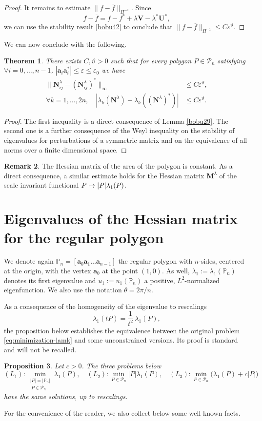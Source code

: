 \documentclass[11pt]{article}
\numberwithin{equation}{section}\newtheorem*{jepEnonce}{\jepEnonceTitle}\newenvironment{enonce*}[1]{\def\jepEnonceTitle{#1}\jepEnonce}{\endjepEnonce}\newtheorem*{conj*}{Conjecture}
\def\mto{\mathchoice{\longmapsto}{\mapsto}{\mapsto}{\mapsto}}
\theoremstyle{plain}
\newtheorem{thm}{Theorem}[section]
\newtheorem{propo}[thm]{Proposition}
\theoremstyle{definition}
\newtheorem{rem}[thm]{Remark}
\newcommand{\bo}[1]{{\boldsymbol#1}}
\newcommand{\thetathree}{\vartheta}
\def\Pp{{\mathbb{P}_n}}
\newcommand{\vps}{\varepsilon}
\newcommand{\lb}{\lambda}
\newcommand{\ov}{\overline}
\begin{document}
\begin{proof}
It remains to estimate $ \| f -\ov f\| _{H^{-1}}$. Since
\[
f-\ov f= f-f^* + \lb \bo V-\lb^* \bo U^*,
\]
we can use the stability result \eqref{bobu42} to conclude that
$\| f -\ov f\| _{H^{-1}} \le C \vps^\thetathree$.
\end{proof}

We can now conclude with the following.
\begin{thm}\label{bobu43}
There exists $C, \thetathree >0$ such that for every polygon $P \in {\mathcal P}_n$ satisfying $\forall i=0, \dots, n-1$, $|\bo a_i\bo a_i^*| \le \vps \le \vps _0$ we have
\begin{align*}
\|\bo N^\lb _{ij} -(\bo N^\lb _{ij})^*\|_\infty &\le C \vps^\thetathree,
\\
\forall k=1, \dots, 2n, \quad |\lb_k(\bo N^\lb)- \lb_k((\bo N^{\lb})^*)|&\le C \vps^\thetathree.
\end{align*}
\end{thm}
\begin{proof}
The first inequality is a direct consequence of Lemma \ref{bobu29}. The second one is a further consequence of the Weyl inequality on the stability of eigenvalues for perturbations of a symmetric matrix and on the equivalence of all norms over a finite dimensional space.
\end{proof}

\begin{rem}
The Hessian matrix of the area of the polygon is constant. As a direct consequence, a similar estimate holds for the Hessian matrix $\bo M^\lambda$ of the scale invariant functional $P\mto |P|\lambda_1(P)$.
\end{rem}

\section{Eigenvalues of the Hessian matrix for the regular polygon}
\label{sec:eig-hessian}

We denote again $\Pp =[\bo a_0 \bo a_1 \dots\bo a_{n-1}]$ the regular polygon with $n$-sides, centered at the origin, with the vertex $\bo a_0$ at the point $(1,0)$. As well, $\lb_1:= \lb_1(\Pp)$ denotes its first eigenvalue and $u_1:=u_1(\Pp)$ a positive, $L^2$-normalized eigenfunction. We also use the notation $\theta = 2\pi/n$.

As a consequence of the homogeneity of the eigenvalue to rescalings
\[
\lambda_1(tP) = \frac{1}{t^2}\, \lambda_1(P),
\]
the proposition below establishes the equivalence between the original problem \eqref{eq:minimization-lamk} and some unconstrained versions. Its proof is standard and will not be recalled.
\begin{propo}
Let $c>0$. The three problems below
\begin{equation}\label{eq:constr}
(L_1): \min_{\substack{|P|=|\Pp|\\\ P \in \mathcal P_n}} \lambda_1(P), \quad (L_2): \min_{P \in \mathcal P_n} |P| \lambda_1(P), \quad (L_3):\min_{P\in \mathcal P_n} \big (\lambda_1(P) +c |P|\big)
\end{equation}
have the same solutions, up to rescalings.
\end{propo}
For the convenience of the reader,
we also collect below some well known facts.
\end{document}
